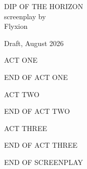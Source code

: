 \documentclass[12pt]{article}
\newcommand{\actbreak}[1]{%
  \clearpage\thispagestyle{plain}%
  \vspace*{2in}%
  \begin{center}#1\end{center}%
  \vspace{2\baselineskip}%
}
\newcommand{\actclose}[1]{%
  \par\vspace{1.5\baselineskip}\begin{center}#1\end{center}\vspace{1\baselineskip}%
}
\begin{document}
\thispagestyle{empty}
\begin{center}
\vspace*{2.3in}
{\Large DIP OF THE HORIZON}\\[0.5in]
{\normalsize screenplay by}\\[0.15in]
{\normalsize Flyxion}
\end{center}
\vfill
\begin{flushleft}
\footnotesize
Draft, August 2026\\
\end{flushleft}
\clearpage

\actbreak{ACT ONE}

\actclose{END OF ACT ONE}

\actbreak{ACT TWO}

\actclose{END OF ACT TWO}

\actbreak{ACT THREE}

\actclose{END OF ACT THREE}

\clearpage
\thispagestyle{plain}
\begin{center}
END OF SCREENPLAY
\end{center}
\end{document}
